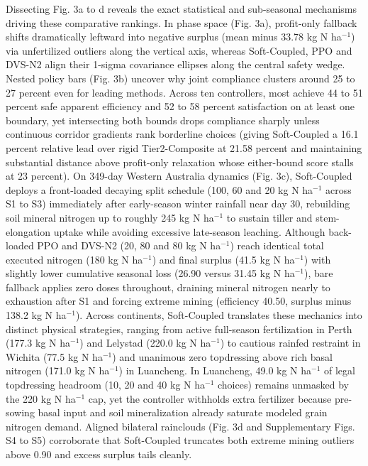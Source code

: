 \documentclass[11pt,a4paper]{article}
\begin{document}
Dissecting Fig. 3a to d reveals the exact statistical and sub-seasonal mechanisms driving these comparative rankings. In phase space (Fig. 3a), profit-only fallback shifts dramatically leftward into negative surplus (mean minus 33.78 kg N ha$^{-1}$) via unfertilized outliers along the vertical axis, whereas Soft-Coupled, PPO and DVS-N2 align their 1-sigma covariance ellipses along the central safety wedge. Nested policy bars (Fig. 3b) uncover why joint compliance clusters around 25 to 27 percent even for leading methods. Across ten controllers, most achieve 44 to 51 percent safe apparent efficiency and 52 to 58 percent satisfaction on at least one boundary, yet intersecting both bounds drops compliance sharply unless continuous corridor gradients rank borderline choices (giving Soft-Coupled a 16.1 percent relative lead over rigid Tier2-Composite at 21.58 percent and maintaining substantial distance above profit-only relaxation whose either-bound score stalls at 23 percent). On 349-day Western Australia dynamics (Fig. 3c), Soft-Coupled deploys a front-loaded decaying split schedule (100, 60 and 20 kg N ha$^{-1}$ across S1 to S3) immediately after early-season winter rainfall near day 30, rebuilding soil mineral nitrogen up to roughly 245 kg N ha$^{-1}$ to sustain tiller and stem-elongation uptake while avoiding excessive late-season leaching. Although back-loaded PPO and DVS-N2 (20, 80 and 80 kg N ha$^{-1}$) reach identical total executed nitrogen (180 kg N ha$^{-1}$) and final surplus (41.5 kg N ha$^{-1}$) with slightly lower cumulative seasonal loss (26.90 versus 31.45 kg N ha$^{-1}$), bare fallback applies zero doses throughout, draining mineral nitrogen nearly to exhaustion after S1 and forcing extreme mining (efficiency 40.50, surplus minus 138.2 kg N ha$^{-1}$). Across continents, Soft-Coupled translates these mechanics into distinct physical strategies, ranging from active full-season fertilization in Perth (177.3 kg N ha$^{-1}$) and Lelystad (220.0 kg N ha$^{-1}$) to cautious rainfed restraint in Wichita (77.5 kg N ha$^{-1}$) and unanimous zero topdressing above rich basal nitrogen (171.0 kg N ha$^{-1}$) in Luancheng. In Luancheng, 49.0 kg N ha$^{-1}$ of legal topdressing headroom (10, 20 and 40 kg N ha$^{-1}$ choices) remains unmasked by the 220 kg N ha$^{-1}$ cap, yet the controller withholds extra fertilizer because pre-sowing basal input and soil mineralization already saturate modeled grain nitrogen demand. Aligned bilateral rainclouds (Fig. 3d and Supplementary Figs. S4 to S5) corroborate that Soft-Coupled truncates both extreme mining outliers above 0.90 and excess surplus tails cleanly.
\end{document}
